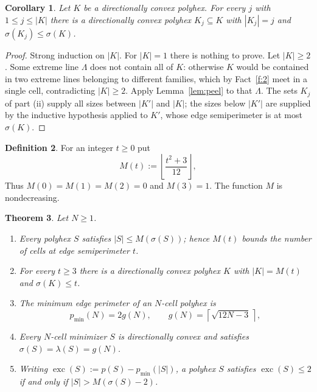 \documentclass[11pt]{article}
\theoremstyle{plain}
\newtheorem{theorem}{Theorem}[section]
\newtheorem{corollary}[theorem]{Corollary}
\theoremstyle{definition}
\newtheorem{definition}[theorem]{Definition}
\theoremstyle{remark}
\DeclareMathOperator{\exc}{exc}
\begin{document}
\begin{corollary}\label{cor:subsets}
Let \(K\) be a directionally convex polyhex. For every \(j\) with \(1\le j\le|K|\) there is
a directionally convex polyhex \(K_{j}\subseteq K\) with \(|K_{j}|=j\) and
\(\sigma(K_{j})\le\sigma(K)\).
\end{corollary}

\begin{proof}
Strong induction on \(|K|\). For \(|K|=1\) there is nothing to prove. Let \(|K|\ge2\). Some
extreme line \(\Lambda\) does not contain all of \(K\): otherwise \(K\) would be contained
in two extreme lines belonging to different families, which by Fact~\ref{f:2} meet in a
single cell, contradicting \(|K|\ge2\). Apply Lemma~\ref{lem:peel} to that \(\Lambda\). The
sets \(K_{j}\) of part (ii) supply all sizes between \(|K'|\) and \(|K|\); the sizes below
\(|K'|\) are supplied by the inductive hypothesis applied to \(K'\), whose edge
semiperimeter is at most \(\sigma(K)\).
\end{proof}

\begin{definition}\label{def:M}
For an integer \(t\ge0\) put
\[
   M(t):=\left\lfloor\frac{t^{2}+3}{12}\right\rfloor ,
\]
Thus
\(M(0)=M(1)=M(2)=0\) and \(M(3)=1\). The function \(M\) is nondecreasing.
\end{definition}

\begin{theorem}\label{thm:capacity}
Let \(N\ge1\).
\begin{enumerate}
\item[(a)] Every polyhex \(S\) satisfies \(|S|\le M(\sigma(S))\); hence \(M(t)\) bounds the number of cells at edge semiperimeter \(t\).
\item[(b)] For every \(t\ge3\) there is a directionally convex polyhex \(K\) with
\(|K|=M(t)\) and \(\sigma(K)\le t\).
\item[(c)] The minimum edge perimeter of an \(N\)-cell polyhex is
\[
   p_{\min}(N)=2g(N),\qquad g(N)=\left\lceil\sqrt{12N-3}\,\right\rceil ,
\]

\item[(d)] Every \(N\)-cell minimizer \(S\) is directionally convex and satisfies
\(\sigma(S)=\lambda(S)=g(N)\).
\item[(e)] Writing \(\exc(S):=p(S)-p_{\min}(|S|)\), a polyhex \(S\) satisfies
\(\exc(S)\le2\) if and only if \(|S|>M(\sigma(S)-2)\).
\end{enumerate}
\end{theorem}
\end{document}
